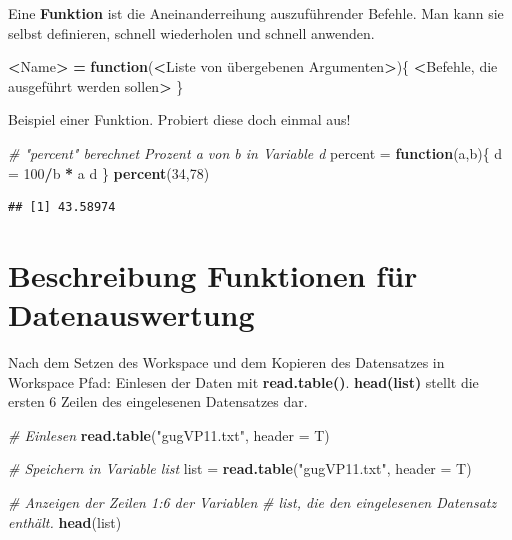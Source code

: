 \documentclass[]{book}
\newenvironment{Shaded}{\begin{snugshade}}{\end{snugshade}}
\newcommand{\KeywordTok}[1]{\textcolor[rgb]{0.13,0.29,0.53}{\textbf{#1}}}
\newcommand{\DataTypeTok}[1]{\textcolor[rgb]{0.13,0.29,0.53}{#1}}
\newcommand{\DecValTok}[1]{\textcolor[rgb]{0.00,0.00,0.81}{#1}}
\newcommand{\StringTok}[1]{\textcolor[rgb]{0.31,0.60,0.02}{#1}}
\newcommand{\CommentTok}[1]{\textcolor[rgb]{0.56,0.35,0.01}{\textit{#1}}}
\newcommand{\ControlFlowTok}[1]{\textcolor[rgb]{0.13,0.29,0.53}{\textbf{#1}}}
\newcommand{\OperatorTok}[1]{\textcolor[rgb]{0.81,0.36,0.00}{\textbf{#1}}}
\newcommand{\ErrorTok}[1]{\textcolor[rgb]{0.64,0.00,0.00}{\textbf{#1}}}
\newcommand{\NormalTok}[1]{#1}
\begin{document}
Eine \textbf{Funktion} ist die Aneinanderreihung auszuführender Befehle.
Man kann sie selbst definieren, schnell wiederholen und schnell
anwenden.

\begin{Shaded}
\begin{Highlighting}[]
\OperatorTok{<}\NormalTok{Name}\OperatorTok{>}\StringTok{ }\ErrorTok{=}\StringTok{ }\ControlFlowTok{function}\NormalTok{(}\OperatorTok{<}\NormalTok{Liste von übergebenen Argumenten}\OperatorTok{>}\NormalTok{)\{}
  \OperatorTok{<}\NormalTok{Befehle, die ausgeführt werden sollen}\OperatorTok{>}
\NormalTok{\}}
\end{Highlighting}
\end{Shaded}

Beispiel einer Funktion. Probiert diese doch einmal aus!

\begin{Shaded}
\begin{Highlighting}[]
\CommentTok{# "percent" berechnet Prozent a von b in Variable d}
\NormalTok{percent =}\StringTok{ }\ControlFlowTok{function}\NormalTok{(a,b)\{ }
\NormalTok{    d =}\StringTok{ }\DecValTok{100}\OperatorTok{/}\NormalTok{b }\OperatorTok{*}\StringTok{ }\NormalTok{a}
\NormalTok{    d}
\NormalTok{\}}
\KeywordTok{percent}\NormalTok{(}\DecValTok{34}\NormalTok{,}\DecValTok{78}\NormalTok{)}
\end{Highlighting}
\end{Shaded}

\begin{verbatim}
## [1] 43.58974
\end{verbatim}

\chapter{Beschreibung Funktionen für
Datenauswertung}\label{beschreibung-funktionen-fuxfcr-datenauswertung}

Nach dem Setzen des Workspace und dem Kopieren des Datensatzes in
Workspace Pfad: Einlesen der Daten mit \textbf{read.table()}.
\textbf{head(list)} stellt die ersten 6 Zeilen des eingelesenen
Datensatzes dar.

\begin{Shaded}
\begin{Highlighting}[]
\CommentTok{# Einlesen}
\KeywordTok{read.table}\NormalTok{(}\StringTok{"gugVP11.txt"}\NormalTok{, }\DataTypeTok{header =}\NormalTok{ T)}

\CommentTok{# Speichern in Variable list}
\NormalTok{list =}\StringTok{ }\KeywordTok{read.table}\NormalTok{(}\StringTok{"gugVP11.txt"}\NormalTok{, }\DataTypeTok{header =}\NormalTok{ T)}

\CommentTok{# Anzeigen der Zeilen 1:6 der Variablen }
\CommentTok{# list, die den eingelesenen Datensatz enthält.}
\KeywordTok{head}\NormalTok{(list)}
\end{Highlighting}
\end{Shaded}
\end{document}
